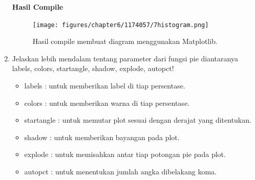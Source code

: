 \begin{enumerate}
			\hfill \break
			\textbf{Hasil Compile}

			\begin{figure}[H]
				\texttt{[image: figures/chapter6/1174057/7histogram.png]}
				\centering
				\caption{Hasil compile membuat diagram menggunakan Matplotlib.}
			\end{figure}
			
		\item Jelaskan lebih mendalam tentang parameter dari fungsi pie diantaranya labels, colors, startangle, shadow, explode, autopct!
 
			 \begin{itemize}
				\item labels : untuk memberikan label di tiap persentase.
				\item colors : untuk memberikan warna di tiap persentase.
				\item startangle : untuk memutar plot sesuai dengan derajat yang ditentukan.
				\item shadow : untuk memberikan bayangan pada plot.
				\item explode : untuk memisahkan antar tiap potongan pie pada plot.
				\item autopct : untuk menentukan jumlah angka dibelakang koma.
			 \end{itemize}
		
	\end{enumerate}
	
